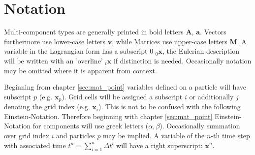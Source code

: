 \documentclass[m,times]{cgMA}
\begin{document}
\section{Notation}\label{sec:notation}
Multi-component types are generally printed in bold letters $\boldsymbol{A}$, $\boldsymbol{a}$. Vectors furthermore use lower-case letters $\boldsymbol{v}$, while Matrices use upper-case letters $\boldsymbol{M}$. A variable in the Lagrangian form has a subscript 0 $ _0{\boldsymbol{x}}$, the Eulerian description will be written with an 'overline' $_t\boldsymbol{x}$ if distinction is needed. Occasionally notation may be omitted where it is apparent from context.

Beginning from chapter \ref{sec:mat_point} variables defined on a particle will have subscript $p$ (e.g. $\boldsymbol{x}_p$). Grid cells will be assigned a subscript $i$ or additionally $j$ denoting the grid index (e.g. $\boldsymbol{x}_i$). This is not to be confused with the following Einstein-Notation. Therefore beginning with chapter \ref{sec:mat_point} Einstein-Notation for components will use greek letters ($\alpha,\beta$). Occasionally summation over grid index $i$ and particles $p$ may be implied. A variable of the $n$-th time step with associated time $t^n = \sum_{i=1}^{n} \Delta t^i$ will have a right superscript: $\boldsymbol{x}^n$.
\end{document}
